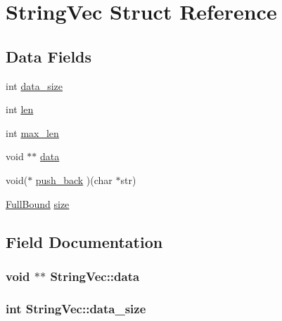 \hypertarget{struct_string_vec}{}\section{String\+Vec Struct Reference}
\label{struct_string_vec}
\subsection*{Data Fields}
\begin{DoxyCompactItemize}
\item 
int \hyperlink{struct_string_vec_a4833997da46043501e6fbfafaa01dabf}{data\+\_\+size}
\item 
int \hyperlink{struct_string_vec_a7c24f16a046318d0be2902e0b40f07e4}{len}
\item 
int \hyperlink{struct_string_vec_a78df5c5f47656d385e2f6d1f2e9ed62b}{max\+\_\+len}
\item 
void $\ast$$\ast$ \hyperlink{struct_string_vec_a0ef48f702209e994978bb9bb6c13291c}{data}
\item 
void($\ast$ \hyperlink{struct_string_vec_af05c9a2ae87afdb54531240ca7ff125d}{push\+\_\+back} )(char $\ast$str)
\item 
\hyperlink{bind__defs_8h_a7c87cc0eb01b046c5adc0fb1d6fcd62c}{Full\+Bound} \hyperlink{struct_string_vec_ae4ae32f5a45935a1d362357d264b6c2c}{size}
\end{DoxyCompactItemize}


\subsection{Field Documentation}
\subsubsection[{\texorpdfstring{data}{data}}]{\setlength{\rightskip}{0pt plus 5cm}void $\ast$$\ast$ String\+Vec\+::data}\hypertarget{struct_string_vec_a0ef48f702209e994978bb9bb6c13291c}{}\label{struct_string_vec_a0ef48f702209e994978bb9bb6c13291c}
\subsubsection[{\texorpdfstring{data\+\_\+size}{data_size}}]{\setlength{\rightskip}{0pt plus 5cm}int String\+Vec\+::data\+\_\+size}\hypertarget{struct_string_vec_a4833997da46043501e6fbfafaa01dabf}{}\label{struct_string_vec_a4833997da46043501e6fbfafaa01dabf}
